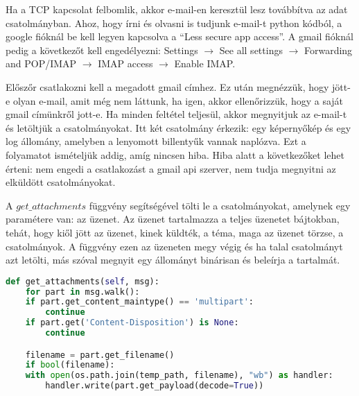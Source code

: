 \documentclass[a4paper, 11pt]{article}
\begin{document}
Ha a TCP kapcsolat felbomlik, akkor e-mail-en keresztül lesz továbbítva az adat csatolmányban. Ahoz, hogy írni és olvasni is tudjunk e-mail-t python kódból, a google fióknál be kell legyen kapcsolva a ``Less secure app access''. A gmail fióknál pedig a következőt kell engedélyezni: Settings $\rightarrow$ See all settings $\rightarrow$ Forwarding and POP/IMAP $\rightarrow$ IMAP access $\rightarrow$ Enable IMAP.

Előszőr csatlakozni kell a megadott gmail címhez. Ez után megnézzük, hogy jött-e olyan e-mail, amit még nem láttunk, ha igen, akkor ellenőrizzük, hogy a saját gmail címünkről jott-e. Ha minden feltétel teljesül, akkor megnyitjuk az e-mail-t és letöltjük a csatolmányokat. Itt két csatolmány érkezik: egy képernyőkép és egy log állomány, amelyben a lenyomott billentyűk vannak naplózva. Ezt a folyamatot ismételjük addig, amíg nincsen hiba. Hiba alatt a következőket lehet érteni: nem engedi a csatlakozást a gmail api szerver, nem tudja megnyitni az elküldött csatolmányokat.

A $get\_attachments$ függvény segítségével tölti le a csatolmányokat, amelynek egy paramétere van: az üzenet. Az üzenet tartalmazza a teljes üzenetet bájtokban, tehát, hogy kiől jött az üzenet, kinek küldték, a téma, maga az üzenet törzse, a csatolmányok. A függvény ezen az üzeneten megy végig és ha talal csatolmányt azt letölti, más szóval megnyit egy állományt binárisan és beleírja a tartalmát.
\begin{lstlisting}[language=Python]
def get_attachments(self, msg):
    for part in msg.walk():
    if part.get_content_maintype() == 'multipart':
        continue
    if part.get('Content-Disposition') is None:
        continue

    filename = part.get_filename()
    if bool(filename):
    with open(os.path.join(temp_path, filename), "wb") as handler:
        handler.write(part.get_payload(decode=True))
\end{lstlisting}
\end{document}
